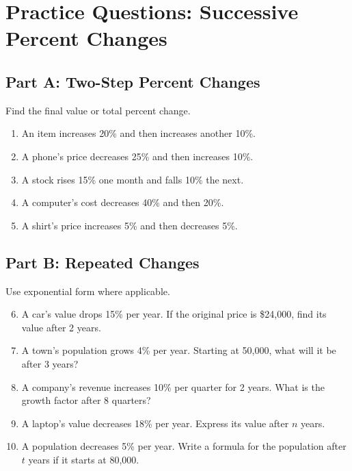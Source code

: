 \documentclass[14pt]{extarticle}
\begin{document}
\newpage


\section*{Practice Questions: Successive Percent Changes}

\subsection*{Part A: Two-Step Percent Changes}
Find the final value or total percent change.
\begin{enumerate}
  \item An item increases 20\% and then increases another 10\%.
  \item A phone’s price decreases 25\% and then increases 10\%.
  \item A stock rises 15\% one month and falls 10\% the next.
  \item A computer’s cost decreases 40\% and then 20\%.
  \item A shirt’s price increases 5\% and then decreases 5\%.
\end{enumerate}

\subsection*{Part B: Repeated Changes}
Use exponential form where applicable.
\begin{enumerate}
  \setcounter{enumi}{5}
  \item A car’s value drops 15\% per year. If the original price is \$24,000, find its value after 2 years.
  \item A town’s population grows 4\% per year. Starting at 50,000, what will it be after 3 years?
  \item A company’s revenue increases 10\% per quarter for 2 years. What is the growth factor after 8 quarters?
  \item A laptop’s value decreases 18\% per year. Express its value after \(n\) years.
  \item A population decreases 5\% per year. Write a formula for the population after \(t\) years if it starts at 80,000.
\end{enumerate}
\end{document}
